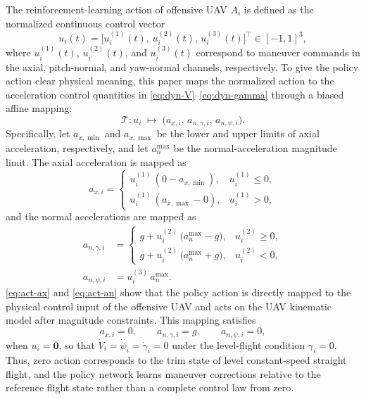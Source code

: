 \documentclass{cja}
\begin{document}
The reinforcement-learning action of offensive UAV $A_i$ is defined as the normalized continuous control vector
\begin{equation}
u_i(t)=\bigl[u_i^{(1)}(t),\,u_i^{(2)}(t),\,u_i^{(3)}(t)\bigr]^{\top}\in[-1,1]^3,
\label{eq:rl-action}
\end{equation}
where $u_i^{(1)}(t)$, $u_i^{(2)}(t)$, and $u_i^{(3)}(t)$ correspond to maneuver commands in the axial, pitch-normal, and yaw-normal channels, respectively. To give the policy action clear physical meaning, this paper maps the normalized action to the acceleration control quantities in \eqref{eq:dyn-V}--\eqref{eq:dyn-gamma} through a biased affine mapping:
\begin{equation}
\mathcal{T}:u_i\;\longmapsto\;\bigl(a_{x,i},\,a_{n,\gamma,i},\,a_{n,\psi,i}\bigr).
\end{equation}
Specifically, let $a_{x,\min}$ and $a_{x,\max}$ be the lower and upper limits of axial acceleration, respectively, and let $a_{n}^{\max}$ be the normal-acceleration magnitude limit. The axial acceleration is mapped as
\begin{equation}
a_{x,i}=
\begin{cases}
u_i^{(1)}\,(0-a_{x,\min}), & u_i^{(1)}\le 0,\\[2pt]
u_i^{(1)}\,(a_{x,\max}-0), & u_i^{(1)}>0,
\end{cases}
\label{eq:act-ax}
\end{equation}
and the normal accelerations are mapped as
\begin{equation}
\begin{aligned}
a_{n,\gamma,i}
&=
\begin{cases}
g+u_i^{(2)}\,\bigl(a_{n}^{\max}-g\bigr), & u_i^{(2)}\ge 0,\\[2pt]
g+u_i^{(2)}\,\bigl(a_{n}^{\max}+g\bigr), & u_i^{(2)}<0,
\end{cases}
\\
a_{n,\psi,i}
&=u_i^{(3)}\,a_{n}^{\max}.
\end{aligned}
\label{eq:act-an}
\end{equation}
\eqref{eq:act-ax} and \eqref{eq:act-an} show that the policy action is directly mapped to the physical control input of the offensive UAV and acts on the UAV kinematic model after magnitude constraints. This mapping satisfies
\begin{equation}
a_{x,i}=0,\qquad a_{n,\gamma,i}=g,\qquad a_{n,\psi,i}=0,
\end{equation}
when $u_i=\mathbf{0}$, so that $\dot V_i=\dot\psi_i=\dot\gamma_i=0$ under the level-flight condition $\gamma_i=0$. Thus, zero action corresponds to the trim state of level constant-speed straight flight, and the policy network learns maneuver corrections relative to the reference flight state rather than a complete control law from zero.
\end{document}
